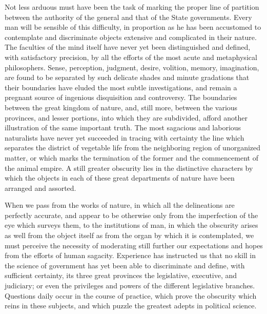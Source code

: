 Not less arduous must have been the task of marking the proper line of partition between the authority of the general and that of the State governments. Every man will be sensible of this difficulty, in proportion as he has been accustomed to contemplate and discriminate objects extensive and complicated in their nature. The faculties of the mind itself have never yet been distinguished and defined, with satisfactory precision, by all the efforts of the most acute and metaphysical philosophers. Sense, perception, judgment, desire, volition, memory, imagination, are found to be separated by such delicate shades and minute gradations that their boundaries have eluded the most subtle investigations, and remain a pregnant source of ingenious disquisition and controversy. The boundaries between the great kingdom of nature, and, still more, between the various provinces, and lesser portions, into which they are subdivided, afford another illustration of the same important truth. The most sagacious and laborious naturalists have never yet succeeded in tracing with certainty the line which separates the district of vegetable life from the neighboring region of unorganized matter, or which marks the termination of the former and the commencement of the animal empire. A still greater obscurity lies in the distinctive characters by which the objects in each of these great departments of nature have been arranged and assorted.

When we pass from the works of nature, in which all the delineations are perfectly accurate, and appear to be otherwise only from the imperfection of the eye which surveys them, to the institutions of man, in which the obscurity arises as well from the object itself as from the organ by which it is contemplated, we must perceive the necessity of moderating still further our expectations and hopes from the efforts of human sagacity. Experience has instructed us that no skill in the science of government has yet been able to discriminate and define, with sufficient certainty, its three great provinces the legislative, executive, and judiciary; or even the privileges and powers of the different legislative branches. Questions daily occur in the course of practice, which prove the obscurity which reins in these subjects, and which puzzle the greatest adepts in political science.

